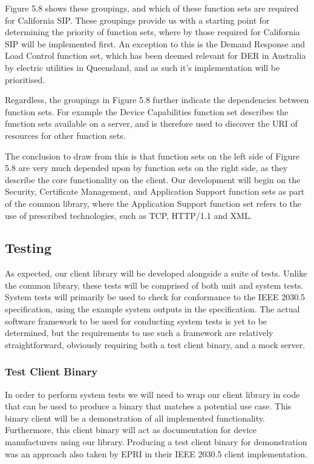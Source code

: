 Figure 5.8 shows these groupings, and which of these function sets are required for California SIP.
These groupings provide us with a starting point for determining the priority of function sets, where by those required for California SIP will be implemented first.
An exception to this is the Demand Response and Load Control function set, which has been deemed relevant for DER in Australia by electric utilities in Queensland, and as such it's implementation will be prioritised. \cite[]{QueenslandDER}

Regardless, the groupings in Figure 5.8 further indicate the dependencies between function sets. For example the Device Capabilities function set describes the function sets available on a server, and is therefore used to discover the URI of resources for other function sets.

The conclusion to draw from this is that function sets on the left side of Figure 5.8 are very much depended upon by function sets on the right side, as they describe the core functionality on the client.
Our development will begin on the Security, Certificate Management, and Application Support function sets as part of the common library, where the Application Support function set refers to the use of prescribed technologies, such as TCP, HTTP/1.1 and XML.


\subsection{Testing}
As expected, our client library will be developed alongside a suite of tests. Unlike the common library, these tests will be comprised of both unit and system tests.
System tests will primarily be used to check for conformance to the IEEE 2030.5 specification, using the example system outputs in the specification.
The actual software framework to be used for conducting system tests is yet to be determined, but the requirements to use such a framework are relatively straightforward, obviously requiring both a test client binary, and a mock server.


\subsubsection{Test Client Binary}
In order to perform system tests we will need to wrap our client library in code that can be used to produce a binary that matches a potential use case.
This binary client will be a demonstration of all implemented functionality.
Furthermore, this client binary will act as documentation for device manufacturers using our library.
Producing a test client binary for demonstration was an approach also taken by EPRI in their IEEE 2030.5 client implementation.

